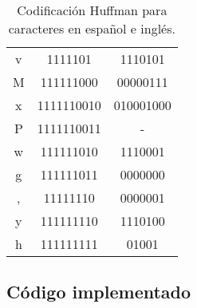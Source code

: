 \documentclass[a4paper]{article}
\begin{document}
\begin{table}[htbp]
\begin{tabular}{|c|c|c|}
v & 1111101 & 1110101 \\
M & 111111000 & 00000111 \\
x & 1111110010 & 010001000 \\
P & 1111110011 & - \\
w & 111111010 & 1110001 \\
g & 111111011 & 0000000 \\
, & 11111110 & 0000001 \\
y & 111111110 & 1110100 \\
h & 111111111 & 01001 \\
\hline
\end{tabular}
\caption{Codificación Huffman para caracteres en español e inglés.}
\label{tab:huffman}
\end{table}


\newpage
\subsection{Código implementado}

\end{document}
